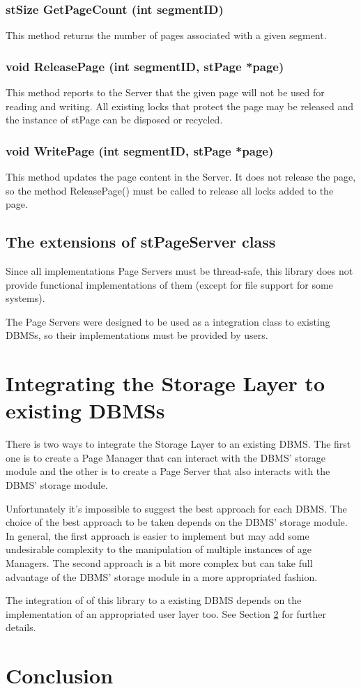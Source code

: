 \subsubsection{stSize GetPageCount (int segmentID)}
This method returns the number of pages associated with a given segment.

\subsubsection{void ReleasePage (int segmentID, stPage *page)}
This method reports to the Server that the given page will not be used for reading and writing. All existing locks that protect the page may be released and the instance of stPage can be disposed or recycled.

\subsubsection{void WritePage (int segmentID, stPage *page)}
This method updates the page content in the Server. It does not release the page, so the method ReleasePage() must be called to release all locks added to the page.

\subsection{The extensions of stPageServer class}

Since all implementations Page Servers must be thread-safe, this library does not provide functional implementations of them (except for file support for some systems).

The Page Servers were designed to be used as a integration class to existing DBMSs, so their implementations must be provided by users.

\section{Integrating the Storage Layer to existing DBMSs}

There is two ways to integrate the Storage Layer to an existing DBMS. The first one is to create a Page Manager that can interact with the DBMS' storage module and the other is to create a Page Server that also interacts with the DBMS' storage module.

Unfortunately it's impossible to suggest the best approach for each DBMS. The choice of the best approach to be taken depends on the DBMS' storage module. In general, the first approach is easier to implement but may add some undesirable complexity to the manipulation of multiple instances of age Managers. The second approach is a bit more complex but can take full advantage of the DBMS' storage module in a more appropriated fashion. 

The integration of of this library to a existing DBMS depends on the implementation of an appropriated user layer too. See Section \ref{} for further details.

\section{Conclusion}
